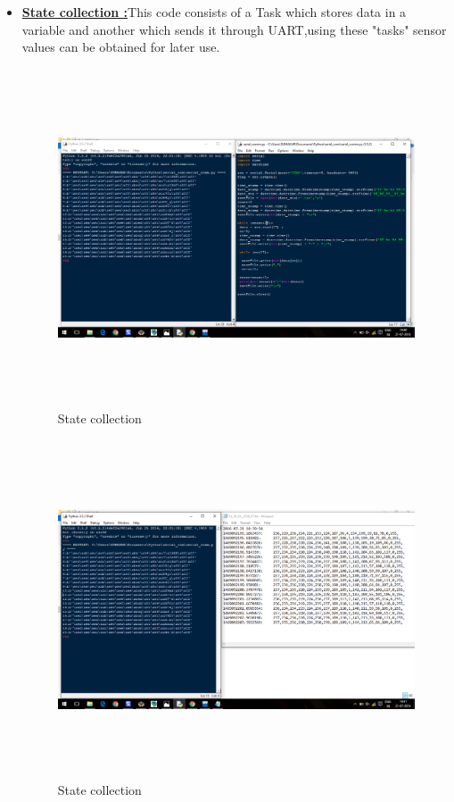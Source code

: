 \documentclass[a4paper,12pt,oneside]{book}
\begin{document}
\begin{itemize}
\item \textbf{\href{https://github.com/eYSIP-2016/RTOS_LPC2148/tree/master/Codes/State_collector}{State collection :}}This code consists of a Task which stores data in a variable and another which sends it through UART,using these "tasks" sensor values can be obtained for later use.
\begin{figure}[h]
\centering
\includegraphics[width=15cm,height=10cm]{Statecollection.png}
\caption{State collection}
\end{figure}
\begin{figure}[h]
\centering
\includegraphics[width=15cm,height=10cm]{Statecollection2.png}
\caption{State collection}
\end{figure}


\end{itemize}
\end{document}
